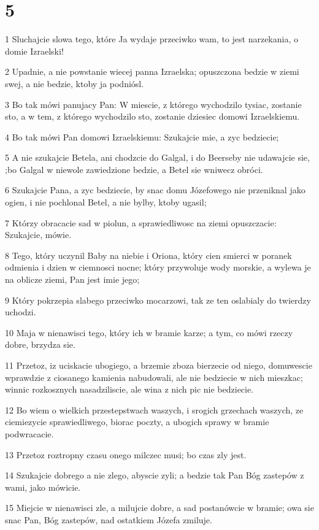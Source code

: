 \chapter{5}

\par 1 Sluchajcie slowa tego, które Ja wydaje przeciwko wam, to jest narzekania, o domie Izraelski!
\par 2 Upadnie, a nie powstanie wiecej panna Izraelska; opuszczona bedzie w ziemi swej, a nie bedzie, ktoby ja podniósl.
\par 3 Bo tak mówi panujacy Pan: W miescie, z którego wychodzilo tysiac, zostanie sto, a w tem, z którego wychodzilo sto, zostanie dziesiec domowi Izraelskiemu.
\par 4 Bo tak mówi Pan domowi Izraelskiemu: Szukajcie mie, a zyc bedziecie;
\par 5 A nie szukajcie Betela, ani chodzcie do Galgal, i do Beerseby nie udawajcie sie, ;bo Galgal w niewole zawiedzione bedzie, a Betel sie wniwecz obróci.
\par 6 Szukajcie Pana, a zyc bedziecie, by snac domu Józefowego nie przeniknal jako ogien, i nie pochlonal Betel, a nie bylby, ktoby ugasil;
\par 7 Którzy obracacie sad w piolun, a sprawiedliwosc na ziemi opuszczacie: Szukajcie, mówie.
\par 8 Tego, który uczynil Baby na niebie i Oriona, który cien smierci w poranek odmienia i dzien w ciemnosci nocne; który przywoluje wody morskie, a wylewa je na oblicze ziemi, Pan jest imie jego;
\par 9 Który pokrzepia slabego przeciwko mocarzowi, tak ze ten oslabialy do twierdzy uchodzi.
\par 10 Maja w nienawisci tego, który ich w bramie karze; a tym, co mówi rzeczy dobre, brzydza sie.
\par 11 Przetoz, iz uciskacie ubogiego, a brzemie zboza bierzecie od niego, domuwescie wprawdzie z ciosanego kamienia nabudowali, ale nie bedziecie w nich mieszkac; winnic rozkosznych nasadziliscie, ale wina z nich pic nie bedziecie.
\par 12 Bo wiem o wielkich przestepstwach waszych, i srogich grzechach waszych, ze ciemiezycie sprawiedliwego, biorac poczty, a ubogich sprawy w bramie podwracacie.
\par 13 Przetoz roztropny czasu onego milczec musi; bo czas zly jest.
\par 14 Szukajcie dobrego a nie zlego, abyscie zyli; a bedzie tak Pan Bóg zastepów z wami, jako mówicie.
\par 15 Miejcie w nienawisci zle, a milujcie dobre, a sad postanówcie w bramie; owa sie snac Pan, Bóg zastepów, nad ostatkiem Józefa zmiluje.
